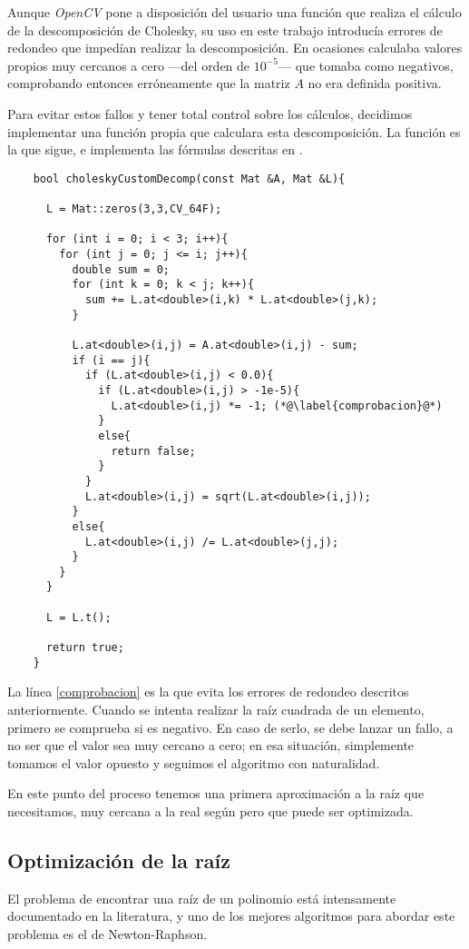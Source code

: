 \documentclass[a4paper, 11pt]{article}
\theoremstyle{definition}
\begin{document}
    Aunque \emph{OpenCV} pone a disposición del usuario una función que realiza el cálculo de la descomposición de Cholesky, su uso en este trabajo introducía errores de redondeo que impedían realizar la descomposición. En ocasiones calculaba valores propios muy cercanos a cero ---del orden de $10^{-5}$--- que tomaba como negativos, comprobando entonces erróneamente que la matriz $A$ no era definida positiva.

    Para evitar estos fallos y tener total control sobre los cálculos, decidimos implementar una función propia que calculara esta descomposición. La función es la que sigue, e implementa las fórmulas descritas en \cite{wikiChol}.
    \begin{lstlisting}
    bool choleskyCustomDecomp(const Mat &A, Mat &L){

      L = Mat::zeros(3,3,CV_64F);

      for (int i = 0; i < 3; i++){
        for (int j = 0; j <= i; j++){
          double sum = 0;
          for (int k = 0; k < j; k++){
            sum += L.at<double>(i,k) * L.at<double>(j,k);
          }

          L.at<double>(i,j) = A.at<double>(i,j) - sum;
          if (i == j){
            if (L.at<double>(i,j) < 0.0){
              if (L.at<double>(i,j) > -1e-5){
                L.at<double>(i,j) *= -1; (*@\label{comprobacion}@*)
              }
              else{
                return false;
              }
            }
            L.at<double>(i,j) = sqrt(L.at<double>(i,j));
          }
          else{
            L.at<double>(i,j) /= L.at<double>(j,j);
          }
        }
      }

      L = L.t();

      return true;
    }
    \end{lstlisting}

    La línea \ref{comprobacion} es la que evita los errores de redondeo descritos anteriormente. Cuando se intenta realizar la raíz cuadrada de un elemento, primero se comprueba si es negativo. En caso de serlo, se debe lanzar un fallo, a no ser que el valor sea muy cercano a cero; en esa situación, simplemente tomamos el valor opuesto y seguimos el algoritmo con naturalidad.

    En este punto del proceso tenemos una primera aproximación a la raíz que necesitamos, muy cercana a la real según \cite{LoopZhang} pero que puede ser optimizada.

    \subsection{Optimización de la raíz}
    El problema de encontrar una raíz de un polinomio está intensamente documentado en la literatura, y uno de los mejores algoritmos para abordar este problema es el de Newton-Raphson.
\end{document}
